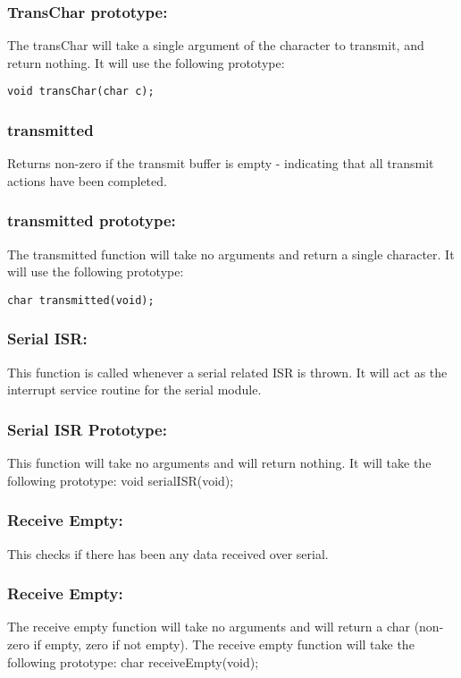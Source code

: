 \documentclass[]{article}
\begin{document}
\subsubsection{TransChar prototype:}
The transChar will take a single argument of the character to transmit, and return nothing. It will use the following prototype: \newline
\begin{lstlisting}
void transChar(char c);
\end{lstlisting}

\subsubsection{transmitted}
Returns non-zero if the transmit buffer is empty - indicating that all transmit actions have been completed.

\subsubsection{transmitted prototype:}
The transmitted function will take no arguments and return a single character. It will use the following prototype: \newline
\begin{lstlisting}
char transmitted(void);
\end{lstlisting}

\subsubsection{Serial ISR:}
This function is called whenever a serial related ISR is thrown. It will act as the interrupt service routine for the serial module.

\subsubsection{Serial ISR Prototype:}
This function will take no arguments and will return nothing. It will take the following prototype: \newline \newline
void serialISR(void);

\subsubsection{Receive Empty:}
This checks if there has been any data received over serial.

\subsubsection{Receive Empty:}
The receive empty function will take no arguments and will return a char (non-zero if empty, zero if not empty). The receive empty function will take the following prototype: \newline \newline
char receiveEmpty(void);
\end{document}
